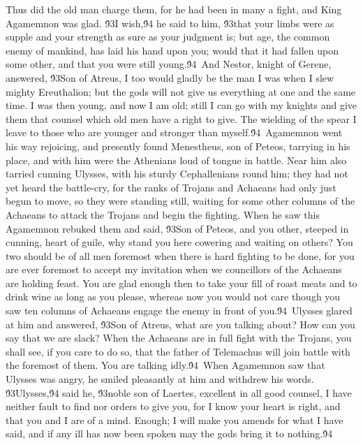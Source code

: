 {Thus did the old man charge them, for he had been in many a fight, and King Agamemnon was glad. \'93I wish,\'94 he said to him, \'93that your limbs were as supple and your strength as sure as your judgment is; but age, the common enemy of mankind, has laid his hand upon you; would that it had fallen upon some other, and that you were still young.\'94\
And Nestor, knight of Gerene, answered, \'93Son of Atreus, I too would gladly be the man I was when I slew mighty Ereuthalion; but the gods will not give us everything at one and the same time. I was then young, and now I am old; still I can go with my knights and give them that counsel which old men have a right to give. The wielding of the spear I leave to those who are younger and stronger than myself.\'94\
Agamemnon went his way rejoicing, and presently found Menestheus, son of Peteos, tarrying in his place, and with him were the Athenians loud of tongue in battle. Near him also tarried cunning Ulysses, with his sturdy Cephallenians round him; they had not yet heard the battle-cry, for the ranks of Trojans and Achaeans had only just begun to move, so they were standing still, waiting for some other columns of the Achaeans to attack the Trojans and begin the fighting. When he saw this Agamemnon rebuked them and said, \'93Son of Peteos, and you other, steeped in cunning, heart of guile, why stand you here cowering and waiting on others? You two should be of all men foremost when there is hard fighting to be done, for you are ever foremost to accept my invitation when we councillors of the Achaeans are holding feast. You are glad enough then to take your fill of roast meats and to drink wine as long as you please, whereas now you would not care though you saw ten columns of Achaeans engage the enemy in front of you.\'94\
Ulysses glared at him and answered, \'93Son of Atreus, what are you talking about? How can you say that we are slack? When the Achaeans are in full fight with the Trojans, you shall see, if you care to do so, that the father of Telemachus will join battle with the foremost of them. You are talking idly.\'94\
When Agamemnon saw that Ulysses was angry, he smiled pleasantly at him and withdrew his words. \'93Ulysses,\'94 said he, \'93noble son of Laertes, excellent in all good counsel, I have neither fault to find nor orders to give you, for I know your heart is right, and that you and I are of a mind. Enough; I will make you amends for what I have said, and if any ill has now been spoken may the gods bring it to nothing.\'94\
}
